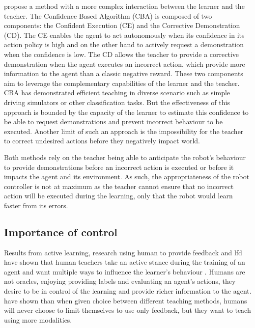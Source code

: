 \cite{chernova2009interactive} propose a method with a more complex interaction between the learner and the teacher. The Confidence Based Algorithm (CBA) is composed of two components: the Confident Execution (CE) and the Corrective Demonstration (CD). The CE enables the agent to act autonomously when its confidence in its action policy is high and on the other hand to actively request a demonstration when the confidence is low. The CD allows the teacher to provide a corrective demonstration when the agent executes an incorrect action, which provide more information to the agent than a classic negative reward. These two components aim to leverage the complementary capabilities of the learner and the teacher. CBA has demonstrated efficient teaching in diverse scenario such as simple driving simulators or other classification tasks. But the effectiveness of this approach is bounded by the capacity of the learner to estimate this confidence to be able to request demonstrations and prevent incorrect behaviour to be executed. Another limit of such an approach is the impossibility for the teacher to correct undesired actions before they negatively impact world. 

Both methods rely on the teacher being able to anticipate the robot's behaviour to provide demonstrations before an incorrect action is executed or before it impacts the agent and its environment. As such, the appropriateness of the robot controller is not at maximum as the teacher cannot ensure that no incorrect action will be executed during the learning, only that the robot would learn faster from its errors.

\subsection{Importance of control}

Results from active learning, research using human to provide feedback and \gls{lfd} have shown that human teachers take an active stance during the training of an agent and want multiple ways to influence the learner's behaviour \citep{amershi2014power}. Humans are not oracles, enjoying providing labels and evaluating an agent's actions, they desire to be in control of the learning and provide richer information to the agent. \cite{kaochar2011towards} have shown than when given choice between different teaching methods, humans will never choose to limit themselves to use only feedback, but they want to teach using more modalities.

